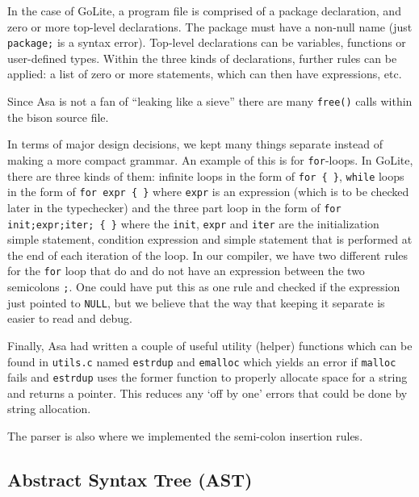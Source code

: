 \documentclass{article}
\begin{document}
In the case of GoLite, a program file is comprised of a package declaration, and zero or more top-level declarations. The package must have a non-null name (just \texttt{package;} is a syntax error). Top-level declarations can be variables, functions or user-defined types. Within the three kinds of declarations, further rules can be applied: a list of zero or more statements, which can then have expressions, etc. 

Since Asa is not a fan of ``leaking like a sieve'' there are many \texttt{free()} calls within the bison source file.

In terms of major design decisions, we kept many things separate instead of making a more compact grammar. An example of this is for \texttt{for}-loops. In GoLite, there are three kinds of them: infinite loops in the form of \texttt{for \{ \}}, \texttt{while} loops in the form of \texttt{for expr  \{ \}} where \texttt{expr} is an expression (which is to be checked later in the typechecker) and the three part loop in the form of \texttt{for init;expr;iter; \{ \}} where the \texttt{init}, \texttt{expr} and \texttt{iter} are the initialization simple statement, condition expression and simple statement that is performed at the end of each iteration of the loop. In our compiler, we have two different rules for the \texttt{for} loop that do and do not have an expression between the two semicolons \texttt{;}. One could have put this as one rule and checked if the expression just pointed to \texttt{NULL}, but we believe that the way that keeping it separate is easier to read and debug.

Finally, Asa had written a couple of useful utility (helper) functions which can be found in \texttt{utils.c} named \texttt{estrdup} and \texttt{emalloc} which yields an error if \texttt{malloc} fails and \texttt{estrdup} uses the former function to properly allocate space for a string and returns a pointer. This reduces any `off by one' errors that could be done by string allocation. 

The parser is also where we implemented the semi-colon insertion rules. 


\subsection{Abstract Syntax Tree (AST)}
\end{document}
